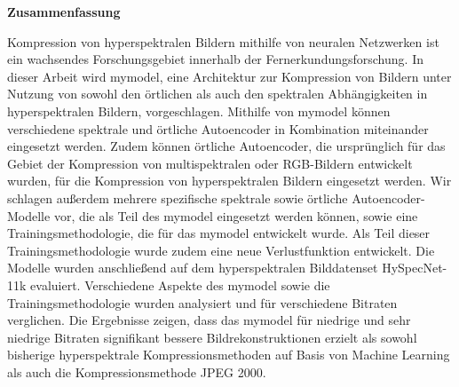\thispagestyle{empty}
\vspace*{1.4cm}

\begin{center}
    {\Large \textbf{Zusammenfassung}}
\end{center}

\vspace*{0.5cm}

\noindent 
Kompression von hyperspektralen Bildern mithilfe von neuralen Netzwerken ist ein wachsendes Forschungsgebiet innerhalb der Fernerkundungsforschung. In dieser Arbeit wird \ac{mymodel}, eine Architektur zur Kompression von Bildern unter Nutzung von sowohl den örtlichen als auch den spektralen Abhängigkeiten in hyperspektralen Bildern, vorgeschlagen. Mithilfe von \ac{mymodel} können verschiedene spektrale und örtliche Autoencoder in Kombination miteinander eingesetzt werden. Zudem können örtliche Autoencoder, die ursprünglich für das Gebiet der Kompression von multispektralen oder RGB-Bildern entwickelt wurden, für die Kompression von hyperspektralen Bildern eingesetzt werden. Wir schlagen außerdem mehrere spezifische spektrale sowie örtliche Autoencoder-Modelle vor, die als Teil des \ac{mymodel} eingesetzt werden können, sowie eine Trainingsmethodologie, die für das \ac{mymodel} entwickelt wurde. Als Teil dieser Trainingsmethodologie wurde zudem eine neue Verlustfunktion entwickelt. Die Modelle wurden anschließend auf dem hyperspektralen Bilddatenset HySpecNet-11k evaluiert. Verschiedene Aspekte des \ac{mymodel} sowie die Trainingsmethodologie wurden analysiert und für verschiedene Bitraten verglichen. Die Ergebnisse zeigen, dass das \ac{mymodel} für niedrige und sehr niedrige Bitraten signifikant bessere Bildrekonstruktionen erzielt als sowohl bisherige hyperspektrale Kompressionsmethoden auf Basis von Machine Learning als auch die Kompressionsmethode JPEG 2000.